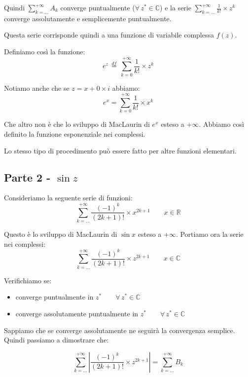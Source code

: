 \documentclass[../../dimostrazioni]{subfiles}
\begin{document}
                Quindi \(\sum_{k=\dots}^{+\infty} A_k\) converge puntualmente (\(\forall \, z^* \in \mathbb{C}\)) 
                e la serie  \(\sum_{k=\dots}^{+\infty} \frac{1}{k!} \times z^k \) converge assolutamente e semplicemente puntualmente.

                Questa serie corrisponde quindi a una funzione di variabile complessa \(f(z)\).

                Definiamo così la funzione:
                \[  e^z \, \stackrel{df}{=} \, \sum_{k=0}^{+\infty} \frac{1}{k!} \times z^k    \]

                Notiamo anche che se \(z = x + 0 \times i\) abbiamo:
                \[  e^x = \sum_{k=0}^{+\infty} \frac{1}{k!} \times x^k \]

                Che altro non è che lo sviluppo di MacLaurin di \(e^x\) esteso a \(+\infty\). 
                Abbiamo così definito la funzione esponenziale nei complessi.

            Lo stesso tipo di procedimento può essere fatto per altre funzioni elementari.
            
            \subsection*{Parte 2 - \(\sin z\)}

                Consideriamo la seguente serie di funzioni:
                \[  \sum_{k=\dots}^{+\infty} \frac{(-1)^k}{(2k+1)!} \times x^{2k+1} \qquad x \in \mathbb{R}  \]

                Questo è lo sviluppo di MacLaurin di \(\sin x\) esteso a \(+ \infty\). Portiamo ora la serie nei complessi:
                \[  \sum_{k=\dots}^{+\infty} \frac{(-1)^k}{(2k+1)!} \times z^{2k+1} \qquad x \in \mathbb{C}  \]

                Verifichiamo se:
                \begin{itemize}
                    \item converge puntualmente in \(z^* \qquad \forall \, z^*  \in \mathbb{C}\)
                    \item converge assolutamente puntualmente in \(z^* \qquad \forall \, z^*  \in \mathbb{C}\)
                \end{itemize}
            
                Sappiamo che se converge assolutamente ne seguirà la convergenza semplice. Quindi passiamo a dimostrare che:

                \[  \sum_{k=\dots}^{+\infty} \left| \frac{(-1)^k}{(2k+1)!} \times z^{2k+1} \right| = \sum_{k=\dots}^{+\infty} B_k \]
\end{document}
